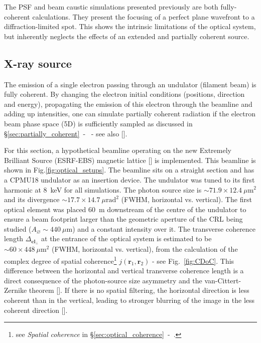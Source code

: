 \begin{refsection}
The PSF and beam caustic simulations presented previously are both fully-coherent calculations. They present the focusing of a perfect plane wavefront to a diffraction-limited spot. This shows the intrinsic limitations of the optical system, but inherently neglects the effects of an extended and partially coherent source.

\subsection{X-ray source}\label{sec:source_sim}
The emission of a single electron passing through an undulator (filament beam) is fully coherent. By changing the electron initial conditions (positions, direction and energy), propagating the emission of this electron through the beamline and adding up intensities, one can simulate partially coherent radiation if the electron beam phase space (5D) is sufficiently sampled as discussed in \S\ref{sec:partially_coherent}~-~\textit{} - see also [\cite{Chubar2011}]. 

For this section, a hypothetical beamline operating on the new Extremely Brilliant Source (ESRF-EBS) magnetic lattice [\cite{orangebook}] is implemented. This beamline is shown in Fig.\ref{fig:optical_setups}. The beamline sits on a straight section and has a CPMU18 undulator as an insertion device. The undulator was tuned to its first harmonic at 8~keV for all simulations. The photon source size is $\sim71.9\times12.4~\mu\text{m}^2$ and its divergence $\sim17.7\times14.7~\mu\text{rad}^2$ (FWHM, horizontal vs. vertical). The first optical element was placed 60~m downstream of the centre of the undulator to ensure a beam footprint larger than the geometric aperture of the CRL being studied ($A_{\diameter}\sim440~\mu\text{m}$) and a constant intensity over it. The transverse coherence length $\Delta_{\textbf{cl}_{\perp}}$ at the entrance of the optical system is estimated to be $\sim60\times448~\mu\text{m}^2$ (FWHM, horizontal vs. vertical), from the calculation of the complex degree of spatial coherence\footnote{see \textit{Spatial coherence} in \S\ref{sec:optical_coherence}~-~\textit{}.} $j(\textbf{r}_1,\textbf{r}_2)$ - see Fig.~\ref{fig:CDoC}. This difference between the horizontal and vertical transverse coherence length is a direct consequence of the photon-source size asymmetry and the van-Cittert-Zernike theorem [\cite[\textit{§4}]{Geloni2008}]. If there is no spatial filtering, the horizontal direction is less coherent than in the vertical, leading to stronger blurring of the image in the less coherent direction [\cite[\textit{\S7.5}]{Goodman2017}]. 


\end{refsection}
